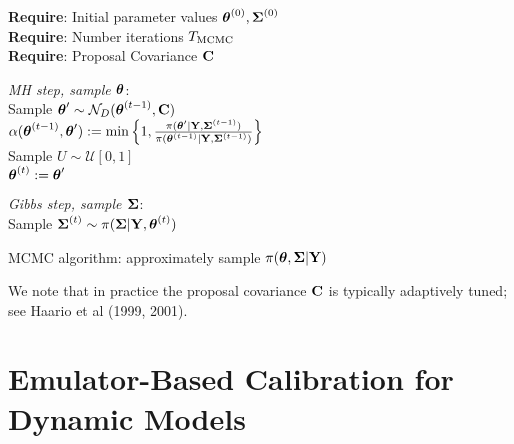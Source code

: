 \documentclass[12pt]{article}
\begin{document}
 \begin{algorithm}[H]
	\SetAlgoLined
	
	\textbf{Require}: Initial parameter values $\boldsymbol{\theta}^{(0)}, \boldsymbol{\Sigma}^{(0)}$ \\
	\textbf{Require}: Number iterations $T_{\text{MCMC}}$ \\
	\textbf{Require}: Proposal Covariance $\mathbf{C}$
		
	\bigskip
	
	 {
	\textit{MH step, sample $\boldsymbol{\theta}$}: \\[.2cm]
	Sample $\boldsymbol{\theta}^\prime \sim \mathcal{N}_{D}(\boldsymbol{\theta}^{(t - 1)}, \mathbf{C})$ \\
	$\alpha(\boldsymbol{\theta}^{(t - 1)}, \boldsymbol{\theta}^\prime) := \min\left\{1, \frac{\pi(\boldsymbol{\theta}^\prime|\mathbf{Y}, \boldsymbol{\Sigma}^{(t-1)})}{\pi(\boldsymbol{\theta}^{(t-1)}|\mathbf{Y}, \boldsymbol{\Sigma}^{(t-1)})} \right\}$ \\

	 Sample $U \sim \mathcal{U}[0, 1]$ \\
	  {
	 	$\boldsymbol{\theta}^{(t)} := \boldsymbol{\theta}^\prime$ \\
	 } 
	
	\bigskip
	
	\textit{Gibbs step, sample $\boldsymbol{\Sigma}$}: \\[.2cm]
	Sample $\boldsymbol{\Sigma}^{(t)} \sim  \pi(\boldsymbol{\Sigma} | \mathbf{Y}, \boldsymbol{\theta}^{(t)})$
}
\caption{MCMC algorithm: approximately sample $\pi(\boldsymbol{\theta}, \boldsymbol{\Sigma}|\mathbf{Y})$}
\end{algorithm}
We note that in practice the proposal covariance $\mathbf{C}$ is typically adaptively tuned; see Haario et al (1999, 2001).  

\section{Emulator-Based Calibration for Dynamic Models}

\end{document}

